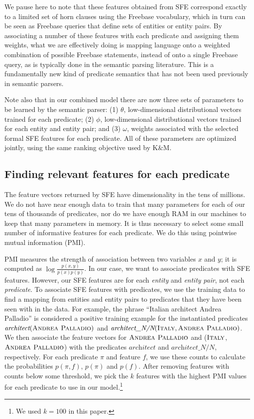 \documentclass[11pt]{article}
\newcommand{\lexicalpredicate}[1]{\ensuremath{\textit{#1}}}
\newcommand{\entity}[1]{\ensuremath{\textsc{#1}}}
\begin{document}
We pause here to note that these features obtained from SFE correspond exactly
to a limited set of horn clauses using the Freebase vocabulary, which in turn
can be seen as Freebase queries that define sets of entities or entity pairs.
By associating a number of these features with each predicate and assigning
them weights, what we are effectively doing is mapping language onto a weighted
combination of possible Freebase statements, instead of onto a single Freebase
query, as is typically done in the semantic parsing literature.  This is a
fundamentally new kind of predicate semantics that has not been used previously
in semantic parsers.

Note also that in our combined model there are now three sets of parameters to
be learned by the semantic parser: (1) $\theta$, low-dimensional distributional
vectors trained for each predicate; (2) $\phi$, low-dimensional distributional
vectors trained for each entity and entity pair; and (3) $\omega$, weights
associated with the selected formal SFE features for each predicate.  All of
these parameters are optimized jointly, using the same ranking objective used
by K\&M.

\subsection{Finding relevant features for each predicate}
\label{sec:computing-pmi}

The feature vectors returned by SFE have dimensionality in the tens of
millions.  We do not have near enough data to train that many parameters for
each of our tens of thousands of predicates, nor do we have enough RAM in our
machines to keep that many parameters in memory.  It is thus necessary to
select some small number of informative features for each predicate.  We do
this using pointwise mutual information (PMI).

PMI measures the strength of association between two variables $x$ and $y$; it
is computed as $\log\frac{p(x,y)}{p(x)p(y)}$.  In our case, we want to
associate predicates with SFE features.  However, our SFE features are for each
\emph{entity} and \emph{entity pair}, not each \emph{predicate}.  To associate
SFE features with predicates, we use the training data to find a mapping from
entities and entity pairs to predicates that they have been seen with in the
data.  For example, the phrase ``Italian architect Andrea Palladio'' is
considered a positive training example for the instantiated predicates
$\lexicalpredicate{architect}(\entity{Andrea Palladio})$ and
$\lexicalpredicate{architect\_N/N}(\entity{Italy}, \entity{Andrea Palladio})$.  We
then associate the feature vectors for \entity{Andrea Palladio} and
(\entity{Italy}, \entity{Andrea Palladio}) with the predicates
\lexicalpredicate{architect} and \lexicalpredicate{architect\_N/N}, respectively.  For each
predicate $\pi$ and feature $f$, we use these counts to calculate the
probabilities $p(\pi, f)$, $p(\pi)$ and $p(f)$.  After removing features with
counts below some threshold, we pick the $k$ features with the highest PMI
values for each predicate to use in our model.\footnote{We used $k=100$ in this
paper.}
\end{document}
